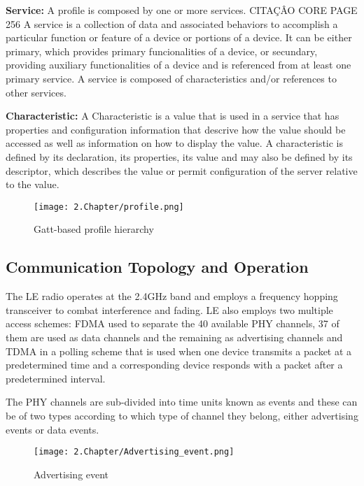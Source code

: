 \tab \textbf{Service:} A profile is composed by one or more services. CITAÇÂO CORE PAGE 256 A service is a collection of data and associated behaviors to accomplish a particular function or feature of a device or portions of a device. It can be either primary, which provides primary funcionalities of a device, or secundary, providing auxiliary functionalities of a device and is referenced from at least one primary service. A service is composed of characteristics and/or references to other services.

\tab \textbf{Characteristic:} A Characteristic is a value that is used in a service that has properties and configuration information that descrive how the value should be accessed as well as information on how to display the value. A characteristic is defined by its declaration, its properties, its value and may also be defined by its descriptor, which describes the value or permit configuration of
the server relative to the value.

\begin{figure}[H]
	\centering
		\texttt{[image: 2.Chapter/profile.png]}
	\caption[Gatt-based profile hierarchy]{Gatt-based profile hierarchy}
	\label{fig:profile}
\end{figure}


\subsection{Communication Topology and Operation}
\label{subsec:Communication}

The \ac{LE} radio operates at the 2.4GHz band and employs a frequency hopping transceiver to combat interference and fading. \ac{LE} also employs two multiple access schemes: \ac{FDMA} used to separate the 40 available \ac{PHY} channels, 37 of them are used as data channels and the remaining as advertising channels and \ac{TDMA} in a polling scheme that is used when one device transmits a packet at a predetermined time and a corresponding device responds with a packet after a predetermined interval.

The \ac{PHY} channels are sub-divided into time units known as events and these can be of two types according to which type of channel they belong, either advertising events or data events. 

\begin{figure}[H]
	\centering
		\texttt{[image: 2.Chapter/Advertising\_event.png]}
	\caption[Advertising event]{Advertising event}
	\label{fig:ad_event}
\end{figure}


